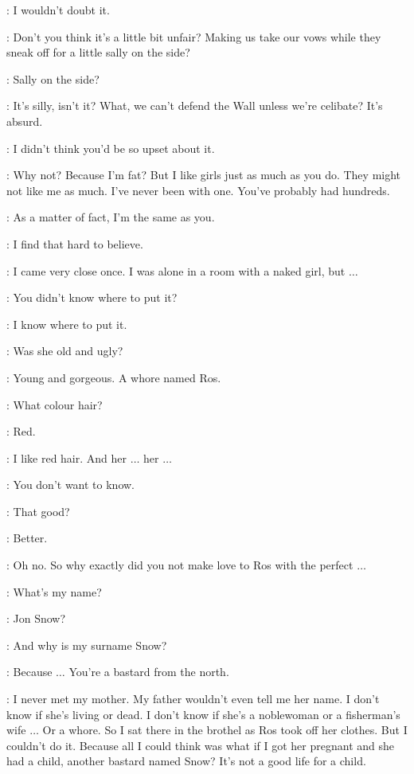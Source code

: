\JON: I wouldn't doubt it. 

\SAM: Don't you think it's a little bit unfair? Making us take our vows while they sneak off for a little sally on the side? 

\JON: Sally on the side? 

\SAM: It's silly, isn't it? What, we can't defend the Wall unless we're celibate? It's absurd. 

\JON: I didn't think you'd be so upset about it. 

\SAM: Why not? Because I'm fat? But I like girls just as much as you do. They might not like me as much. I've never been with one. You've probably had hundreds. 

\JON: As a matter of fact, I'm the same as you. 

\SAM: I find that hard to believe. 

\JON: I came very close once. I was alone in a room with a naked girl, but $\ldots$ 

\SAM: You didn't know where to put it? 

\JON: I know where to put it. 

\SAM: Was she old and ugly? 

\JON: Young and gorgeous. A whore named Ros. 

\SAM: What colour hair? 

\JON: Red. 

\SAM: I like red hair. And her $\ldots$ her $\ldots$ 

\JON: You don't want to know. 

\SAM: That good? 

\JON: Better. 

\SAM: Oh no. So why exactly did you not make love to Ros with the perfect $\ldots$ 

\JON: What's my name? 

\SAM: Jon Snow? 

\JON: And why is my surname Snow? 

\SAM: Because $\ldots$ You're a bastard from the north. 

\JON: I never met my mother. My father wouldn't even tell me her name. I don't know if she's living or dead. I don't know if she's a noblewoman or a fisherman's wife $\ldots$ Or a whore. So I sat there in the brothel as Ros took off her clothes. But I couldn't do it. Because all I could think was what if I got her pregnant and she had a child, another bastard named Snow? It's not a good life for a child. 

